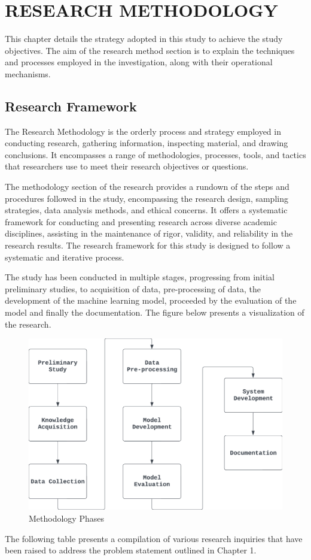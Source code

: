 \chapter{RESEARCH METHODOLOGY}
\label{ch:method}

This chapter details the strategy adopted in this study to achieve the study objectives. The aim of the research method section is to explain the techniques and processes employed in the investigation, along with their operational mechanisms.
\section{Research Framework}
The Research Methodology is the orderly process and strategy employed in conducting research, gathering information, inspecting material, and drawing conclusions. It encompasses a range of methodologies, processes, tools, and tactics that researchers use to meet their research objectives or questions. 

The methodology section of the research provides a rundown of the steps and procedures followed in the study, encompassing the research design, sampling strategies, data analysis methods, and ethical concerns. It offers a systematic framework for conducting and presenting research across diverse academic disciplines, assisting in the maintenance of rigor, validity, and reliability in the research results. The research framework for this study is designed to follow a systematic and iterative process.

The study has been conducted in multiple stages, progressing from initial preliminary studies, to acquisition of data, pre-processing of data, the development of the machine learning model, proceeded by the evaluation of the model and finally the documentation. The figure below presents a visualization of the research.


\begin{figure}[h]
    \centering
    \includegraphics[scale=0.75]{mainmatter/images/research methodology/MPN.png}
    \caption{Methodology Phases}
    \label{fig:methodologyphases}
\end{figure}
\newpage
The following table presents a compilation of various research inquiries that have been raised to address the problem statement outlined in Chapter 1.


